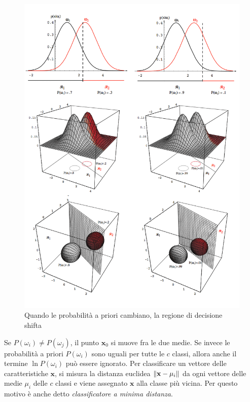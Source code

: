 \begin{figure}
\centering
\includegraphics[scale=0.55]{img/hyperpiano.png}
\caption{Quando le probabilità a priori cambiano, la regione di decisione shifta}
\label{fig_iperpiano}
\end{figure}
Se $P(\omega_i) \neq P(\omega_j)$, il punto $\mathbf{x}_0$ si muove fra le due medie. Se invece le probabilità a priori $P(\omega_i)$ sono uguali per tutte le $c$ classi, allora anche il termine $\ln P(\omega_i)$ può essere ignorato. Per classificare un vettore delle caratteristiche $\mathbf{x}$, si misura la distanza euclidea $\lVert\mathbf{x} - \mu_i\rVert$ da ogni vettore delle medie $\mu_i$ delle $c$ classi e viene assegnato $\mathbf{x}$ alla classe più vicina. Per questo motivo è anche detto \emph{classificatore a minima distanza}. 


